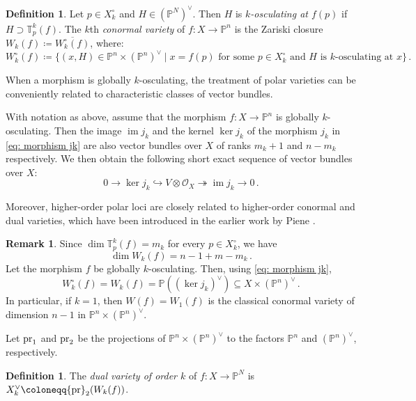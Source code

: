 \documentclass[11pt,reqno]{amsart}
\numberwithin{equation}{section}
\theoremstyle{plain}
\numberwithin{theorem}{section}
\theoremstyle{definition}
\newtheorem{definition}[theorem]{Definition}
\newtheorem{remark}[theorem]{Remark}
\renewcommand{\P}{\mathbb{P}}
\newcommand{\T}{\mathbb{T}}
\newcommand{\OO}{\mathcal{O}}
\newcommand{\pr}{{\rm pr}}
\newcommand{\image}{\operatorname{im}}
\begin{document}
\begin{definition}{\cite[\S 2]{Higherdual}}\label{def: higher conormal variety}
Let $p\in X_k^{\circ}$ and $H\in(\P^N)^\vee.$ Then $H$ is {\em $k$-osculating at $f(p)$} if  $H\supset \T_p^k(f).$ The $k$th {\em conormal variety} of $f\colon X\to\P^n$ is the Zariski closure $W_k(f)\coloneqq\overline{W_k^{\circ}(f)}$, where:
\begin{equation}
    W_k^{\circ}(f) \coloneqq \{(x,H)\in\P^n\times(\P^n)^\vee\mid\text{$x=f(p)$ for some $p\in X_k^{\circ}$ and $H$ is $k$-osculating at $x$}\}\,.
\end{equation}
\end{definition}

When a morphism is globally $k$-osculating, the treatment of polar varieties can be conveniently related to characteristic classes of vector bundles.

With notation as above, assume that the morphism $f\colon X\to\P^n$ is globally $k$-osculating. Then the image $\image j_k$ and the kernel $\ker j_k$ of the morphism $j_k$ in \eqref{eq: morphism jk} are also vector bundles over $X$ of ranks $m_k+1$ and $n-m_k$ respectively.
We then obtain the following short exact sequence of vector bundles over $X$:
\begin{equation}\label{eq: k-jet exact sequence}
0\to \ker j_k \hookrightarrow V\otimes\OO_X \twoheadrightarrow \image j_k \to 0\,.
\end{equation}

Moreover, higher-order polar loci are closely related to higher-order conormal and dual varieties, which have been introduced in the earlier work by Piene \cite{Higherdual}.

\begin{remark}
Since $\dim\T_p^k(f)=m_k$ for every $p\in X_k^{\circ}$, we have
\begin{equation}\label{eq: dim conormal}
\dim W_k(f)=n-1+m-m_k\,.
\end{equation}
Let the morphism $f$ be globally $k$-osculating. Then, using \eqref{eq: morphism jk},
\[
W_k^{\circ}(f)=W_k(f)=\P((\ker j_k)^\vee)\subseteq X\times(\P^n)^\vee\,.
\]
In particular, if $k=1$, then $W(f)=W_1(f)$ is the classical conormal variety of dimension $n-1$ in $\P^n\times(\P^n)^\vee$.
\end{remark}

Let $\pr_1$ and $\pr_2$ be the projections of $\P^n\times(\P^n)^\vee$ to the factors $\P^n$ and $(\P^n)^\vee$, respectively.
\begin{definition}{\cite[\S 2]{Higherdual}}\label{def: dual variety X}
The {\em dual variety of order $k$} of $f\colon X\to\P^N$ is $X_k^\vee\coloneqq \pr_2(W_k(f))$.
\end{definition}
\end{document}
